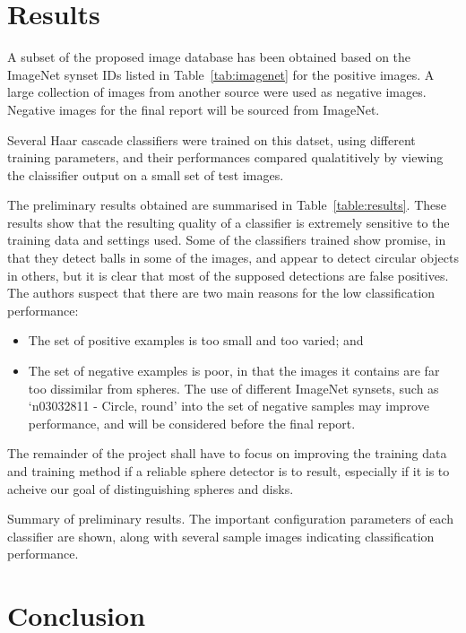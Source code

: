 \documentclass{llncs}
\begin{document}
    \section{Results} {
    \label{sec:results}

        A subset of the proposed image database has been obtained based on the ImageNet synset IDs listed in Table~\ref{tab:imagenet} for the positive images. A large collection of images from another source were used as negative images. Negative images for the final report will be sourced from ImageNet.

        Several Haar cascade classifiers were trained on this datset, using different training parameters, and their performances compared qualatitively by viewing the claissifier output on a small set of test images.

        The preliminary results obtained are summarised in Table~\ref{table:results}.
        These results show that the resulting quality of a classifier is extremely sensitive to the training data and settings used.
        Some of the classifiers trained show promise, in that they detect balls in some of the images, and appear to detect circular objects in others, but it is clear that most of the supposed detections are false positives.
        The authors suspect that there are two main reasons for the low classification performance:

        \begin{itemize}
            \item The set of positive examples is too small and too varied; and
            \item The set of negative examples is poor, in that the images it contains are far too dissimilar from spheres.
                  The use of different ImageNet synsets, such as `n03032811 - Circle, round' into the set of negative samples may improve performance, and will be considered before the final report.
        \end{itemize}

        The remainder of the project shall have to focus on improving the training data and training method if a reliable sphere detector is to result, especially if it is to acheive our goal of distinguishing spheres and disks.

        \begin{table}[h]
            \caption{Summary of preliminary results. The important configuration parameters of each classifier are shown, along with several sample images indicating classification performance.}
            \centering
        \end{table}

    }

    \section{Conclusion} {
    \label{sec:conclusion}

    }

    
    
\end{document}
